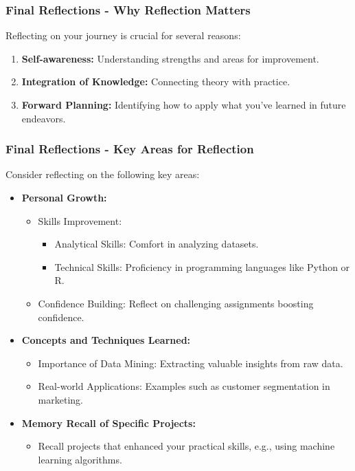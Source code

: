 \documentclass[aspectratio=169]{beamer}
\begin{document}
\begin{frame}[fragile]
    \frametitle{Final Reflections - Why Reflection Matters}
    Reflecting on your journey is crucial for several reasons:
    \begin{enumerate}
        \item \textbf{Self-awareness:} Understanding strengths and areas for improvement.
        \item \textbf{Integration of Knowledge:} Connecting theory with practice.
        \item \textbf{Forward Planning:} Identifying how to apply what you’ve learned in future endeavors.
    \end{enumerate}
\end{frame}

\begin{frame}[fragile]
    \frametitle{Final Reflections - Key Areas for Reflection}
    Consider reflecting on the following key areas:
    \begin{itemize}
        \item \textbf{Personal Growth:}
            \begin{itemize}
                \item Skills Improvement: 
                    \begin{itemize}
                        \item Analytical Skills: Comfort in analyzing datasets.
                        \item Technical Skills: Proficiency in programming languages like Python or R.
                    \end{itemize}
                \item Confidence Building: Reflect on challenging assignments boosting confidence.
            \end{itemize}
        \item \textbf{Concepts and Techniques Learned:}
            \begin{itemize}
                \item Importance of Data Mining: Extracting valuable insights from raw data.
                \item Real-world Applications: Examples such as customer segmentation in marketing.
            \end{itemize}
        \item \textbf{Memory Recall of Specific Projects:}
            \begin{itemize}
                \item Recall projects that enhanced your practical skills, e.g., using machine learning algorithms.
            \end{itemize}
    \end{itemize}
\end{frame}
\end{document}
